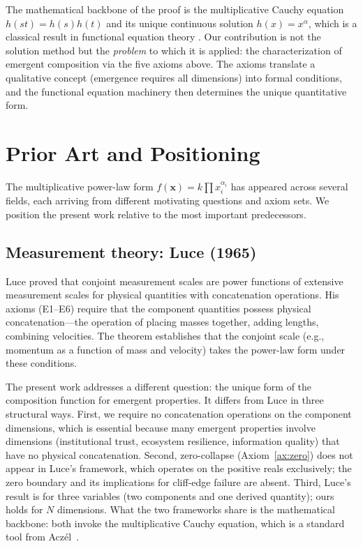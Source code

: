 \documentclass[12pt, a4paper]{article}
\theoremstyle{definition}
\theoremstyle{remark}
\begin{document}
The mathematical backbone of the proof is the multiplicative Cauchy equation $h(st) = h(s)h(t)$ and its unique continuous solution $h(x) = x^\alpha$, which is a classical result in functional equation theory \cite{aczel1966}. Our contribution is not the solution method but the \textit{problem} to which it is applied: the characterization of emergent composition via the five axioms above. The axioms translate a qualitative concept (emergence requires all dimensions) into formal conditions, and the functional equation machinery then determines the unique quantitative form.


\section{Prior Art and Positioning}\label{sec:priorart}

The multiplicative power-law form $f(\mathbf{x}) = k \prod x_i^{\alpha_i}$ has appeared across several fields, each arriving from different motivating questions and axiom sets. We position the present work relative to the most important predecessors.

\subsection{Measurement theory: Luce (1965)}

Luce \cite{luce1965} proved that conjoint measurement scales are power functions of extensive measurement scales for physical quantities with concatenation operations. His axioms (E1--E6) require that the component quantities possess physical concatenation---the operation of placing masses together, adding lengths, combining velocities. The theorem establishes that the conjoint scale (e.g., momentum as a function of mass and velocity) takes the power-law form under these conditions.

The present work addresses a different question: the unique form of the composition function for emergent properties. It differs from Luce in three structural ways. First, we require no concatenation operations on the component dimensions, which is essential because many emergent properties involve dimensions (institutional trust, ecosystem resilience, information quality) that have no physical concatenation. Second, zero-collapse (Axiom~\ref{ax:zero}) does not appear in Luce's framework, which operates on the positive reals exclusively; the zero boundary and its implications for cliff-edge failure are absent. Third, Luce's result is for three variables (two components and one derived quantity); ours holds for $N$ dimensions. What the two frameworks share is the mathematical backbone: both invoke the multiplicative Cauchy equation, which is a standard tool from Acz\'el~\cite{aczel1966}.
\end{document}
